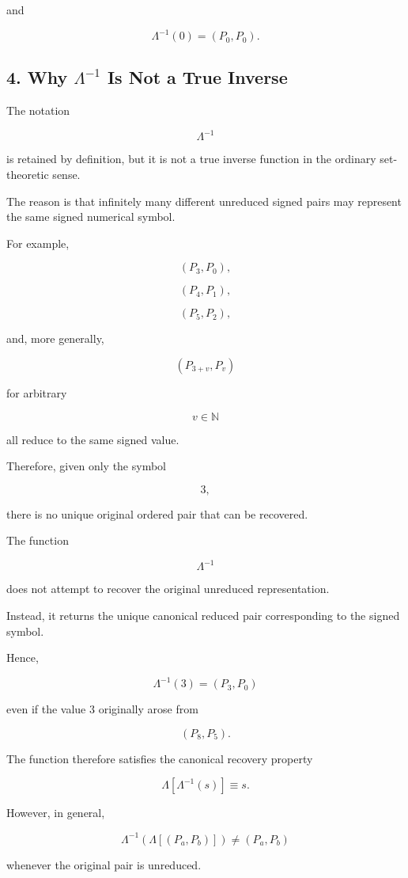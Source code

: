 \documentclass[12pt]{article}
\begin{document}
and

\[
\Lambda^{-1}(0)=(P_0,P_0).
\]

\subsection*{4. Why \(\Lambda^{-1}\) Is Not a True Inverse}

The notation

\[
\Lambda^{-1}
\]

is retained by definition, but it is not a true inverse function in the ordinary set-theoretic sense.

The reason is that infinitely many different unreduced signed pairs may represent the same signed numerical symbol.

For example,

\[
(P_3,P_0),
\]

\[
(P_4,P_1),
\]

\[
(P_5,P_2),
\]

and, more generally,

\[
(P_{3+v},P_v)
\]

for arbitrary

\[
v\in\mathbb N
\]

all reduce to the same signed value.

Therefore, given only the symbol

\[
3,
\]

there is no unique original ordered pair that can be recovered.

The function

\[
\Lambda^{-1}
\]

does not attempt to recover the original unreduced representation.

Instead, it returns the unique canonical reduced pair corresponding to the signed symbol.

Hence,

\[
\boxed{
\Lambda^{-1}(3)=(P_3,P_0)
}
\]

even if the value \(3\) originally arose from

\[
(P_8,P_5).
\]

The function therefore satisfies the canonical recovery property

\[
\boxed{
\Lambda[\Lambda^{-1}(s)]\equiv s.
}
\]

However, in general,

\[
\boxed{
\Lambda^{-1}
\left(
\Lambda[(P_a,P_b)]
\right)
\neq
(P_a,P_b)
}
\]

whenever the original pair is unreduced.
\end{document}
